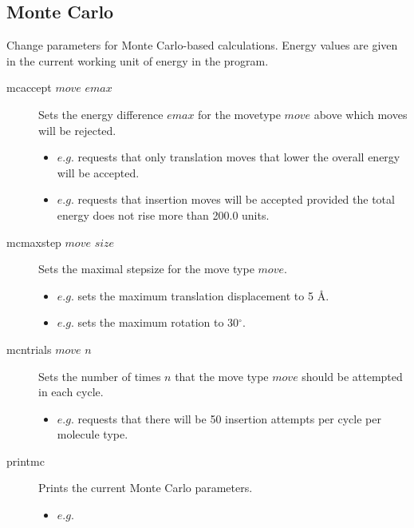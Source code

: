 \subsection{Monte Carlo}
Change parameters for Monte Carlo-based calculations. Energy values are given in the current working unit of energy in the program.\\
\begin{description}

	\item[mcaccept $move$ $emax$\its] Sets the energy difference $emax$ for the movetype $move$ above which moves will be rejected.
	\begin{itemize}
		\item $e.g.$  requests that only translation moves that lower the overall energy will be accepted.
		\item $e.g.$  requests that insertion moves will be accepted provided the total energy does not rise more than 200.0 units.
	\end{itemize}

	\item[mcmaxstep $move$ $size$\its] Sets the maximal stepsize for the move type $move$.
	\begin{itemize}
		\item $e.g.$  sets the maximum translation displacement to 5 \AA.
		\item $e.g.$  sets the maximum rotation to 30$^\circ$.
	\end{itemize}

	\item[mcntrials $move$ $n$\its] Sets the number of times $n$ that the move type $move$ should be attempted in each cycle.
	\begin{itemize}
		\item $e.g.$  requests that there will be 50 insertion attempts per cycle per molecule type.
	\end{itemize}

	\item[printmc\its] Prints the current Monte Carlo parameters.
	\begin{itemize}
		\item $e.g.$ 
	\end{itemize}

\end{description}


